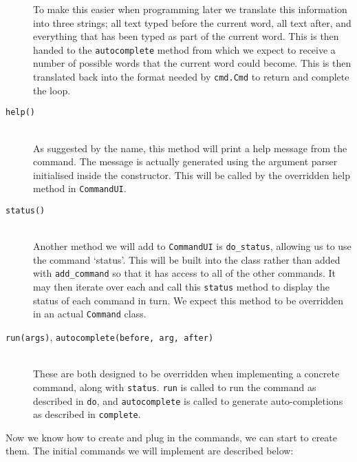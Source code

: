 \documentclass[twoside,a4paper]{report}
\begin{document}
\begin{description}
To make this easier when programming later we translate this information into three strings; all text typed before the current word, all text after,
and everything that has been typed as part of the current word. This is then handed to the \texttt{autocomplete} method from which we
expect to receive a number of possible words that the current word could become. This is then translated back into the format needed by \texttt{cmd.Cmd} to
return and complete the loop.

\item[\texttt{help()}] \hfill \\
As suggested by the name, this method will print a help message from the command. The message is actually generated using the argument parser
initialised inside the constructor. This will be called by the overridden help method in \texttt{CommandUI}.

\item[\texttt{status()}] \hfill \\
Another method we will add to \texttt{CommandUI} is \texttt{do\_status}, allowing us to use the command `status'. This will be built into the
class rather than added with \texttt{add\_command} so that it has access to all of the other commands. It may then iterate over each and call
this \texttt{status} method to display the status of each command in turn. We expect this method to be overridden in an actual \texttt{Command} class.

\item[\texttt{run(args)}, \texttt{autocomplete(before, arg, after)}] \hfill \\
These are both designed to be overridden when implementing a concrete command, along with \texttt{status}. \texttt{run} is called to run the
command as described in \texttt{do}, and \texttt{autocomplete} is called to generate auto-completions as described in \texttt{complete}.
\end{description}

Now we know how to create and plug in the commands, we can start to create them. The initial commands we will implement are described below:
\end{document}
